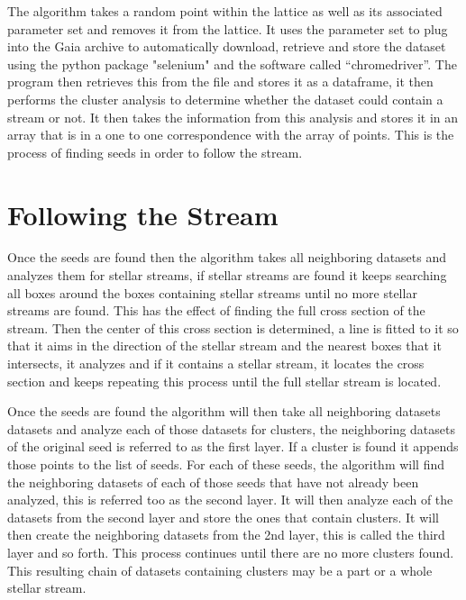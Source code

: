 \documentclass[12pt]{amsart}
\begin{document}
 The algorithm takes a random point within the lattice as well as its associated parameter set and removes it from the lattice. It uses the parameter set to plug into the Gaia archive to automatically download, retrieve and store the dataset using the python package "selenium" and the software called “chromedriver”. The program then retrieves this from the file and stores it as a dataframe, it then performs the cluster analysis to determine whether the dataset could contain a stream or not. It then takes the information from this analysis and stores it in an array that is in a one to one correspondence with the array of points. This is the process of finding seeds in order to follow the stream. 

\section*{Following the Stream} 
Once the seeds are found then the algorithm takes all neighboring datasets and analyzes them for stellar streams, if stellar streams are found it keeps searching all boxes around the boxes containing stellar streams until no more stellar streams are found. This has the effect of finding the full cross section of the stream. Then the center of this cross section is determined, a line is fitted to it so that it aims in the direction of the stellar stream and the nearest boxes that it intersects, it analyzes and if it contains a stellar stream, it locates the cross section and keeps repeating this process until the full stellar stream is located.

Once the seeds are found the algorithm will then take all neighboring datasets datasets and analyze each of those datasets for clusters, the neighboring datasets of the original seed is referred to as the first layer. If a cluster is found it appends those points to the list of seeds. For each of these seeds, the algorithm will find the neighboring datasets of each of those seeds that have not already been analyzed, this is referred too as the second layer. It will then analyze each of the datasets from the second layer and store the ones that contain clusters. It will then create the neighboring datasets from the 2nd layer, this is called the third layer and so forth. This process continues until there are no more clusters found. This resulting chain of datasets containing clusters may be a part or a whole stellar stream.
\end{document}
